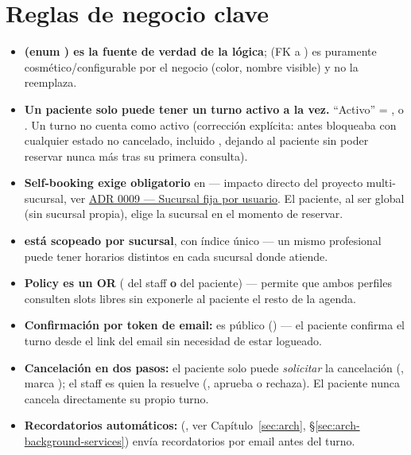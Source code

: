 \section{Reglas de negocio clave}
\label{sec:agenda-reglas}

\begin{itemize}
  \item \textbf{ (enum ) es la fuente de verdad de la lógica};  (FK a ) es puramente cosmético/configurable por el negocio (color, nombre visible) y no la reemplaza.
  \item \textbf{Un paciente solo puede tener un turno activo a la vez.} ``Activo'' = ,  o . Un turno  no cuenta como activo (corrección explícita: antes bloqueaba con cualquier estado no cancelado, incluido , dejando al paciente sin poder reservar nunca más tras su primera consulta).
  \item \textbf{Self-booking exige  obligatorio} en \allowbreak {}\allowbreak {}\allowbreak {} --- impacto directo del proyecto multi-sucursal, ver \hyperref[adr:0009]{ADR 0009 --- Sucursal fija por usuario}. El paciente, al ser global (sin sucursal propia), elige la sucursal en el momento de reservar.
  \item \textbf{\allowbreak {} está scopeado por sucursal}, con índice único  --- un mismo profesional puede tener horarios distintos en cada sucursal donde atiende.
  \item \textbf{Policy  es un OR} ( del staff \textbf{o}  del paciente) --- permite que ambos perfiles consulten slots libres sin exponerle al paciente el resto de la agenda.
  \item \textbf{Confirmación por token de email:}  es público () --- el paciente confirma el turno desde el link del email sin necesidad de estar logueado.
  \item \textbf{Cancelación en dos pasos:} el paciente solo puede \emph{solicitar} la cancelación (, marca ); el staff es quien la resuelve (, aprueba o rechaza). El paciente nunca cancela directamente su propio turno.
  \item \textbf{Recordatorios automáticos:} \allowbreak {}\allowbreak {} (, ver Capítulo~\ref{sec:arch}, \S\ref{sec:arch-background-services}) envía recordatorios por email antes del turno.
\end{itemize}

